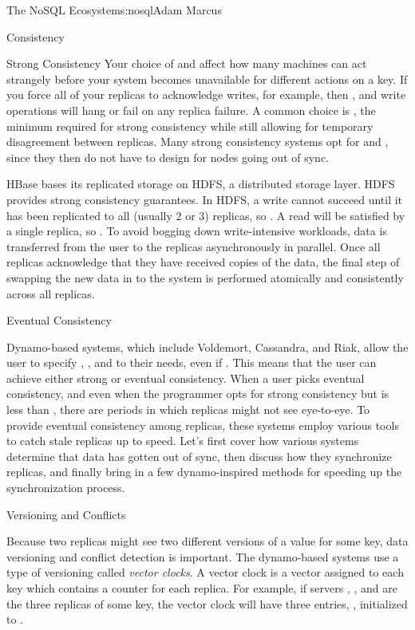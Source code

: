 \begin{aosachapter}{The NoSQL Ecosystem}{s:nosql}{Adam Marcus}
\begin{aosasect1}{Consistency}
\begin{aosasect2}{Strong Consistency}
Your choice of  and  affect how many machines can act
strangely before your system becomes unavailable for different actions
on a key.  If you force all of your replicas to acknowledge writes,
for example, then , and write operations will hang or fail
on any replica failure.  A common choice is ,
the minimum required for strong consistency while still allowing for
temporary disagreement between replicas.  Many strong consistency
systems opt for  and , since they then do not have
to design for nodes going out of sync.

HBase bases its replicated storage on HDFS, a distributed storage layer.  HDFS provides strong consistency
guarantees.  In HDFS, a write cannot succeed until it has been
replicated to all  (usually 2 or 3) replicas, so .
A read will be satisfied by a single replica, so .  To
avoid bogging down write-intensive workloads, data is transferred from
the user to the replicas asynchronously in parallel.  Once all
replicas acknowledge that they have received copies of the data, the
final step of swapping the new data in to the system is performed
atomically and consistently across all replicas.

\end{aosasect2}

\begin{aosasect2}{Eventual Consistency}

Dynamo-based systems, which include Voldemort, Cassandra, and Riak,
allow the user to specify , , and  to their
needs, even if .  This means that the user
can achieve either strong or eventual consistency.  When a user picks
eventual consistency, and even when the programmer opts for strong
consistency but  is less than , there are periods in
which replicas might not see eye-to-eye.  To provide eventual
consistency among replicas, these systems employ various tools to
catch stale replicas up to speed.  Let's first cover how various
systems determine that data has gotten out of sync, then discuss how
they synchronize replicas, and finally bring in a few dynamo-inspired
methods for speeding up the synchronization process.

\begin{aosasect3}{Versioning and Conflicts}

Because two replicas might see two different versions of a value for
some key, data versioning and conflict detection is important.  The
dynamo-based systems use a type of versioning called \emph{vector
clocks}.  A vector clock is a vector assigned to each key which
contains a counter for each replica.  For example, if
servers , , and  are the three replicas of
some key, the vector clock will have three entries, , initialized to .


\end{aosasect3}
\end{aosasect2}
\end{aosasect1}
\end{aosachapter}
